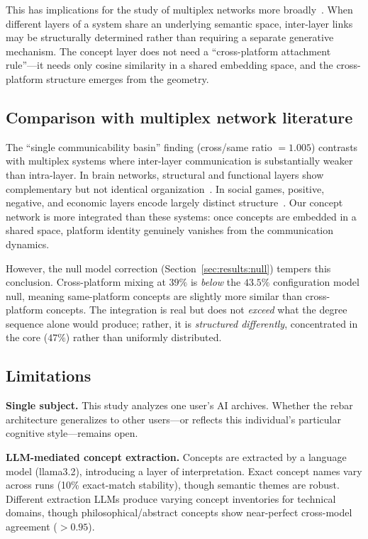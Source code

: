 \documentclass[11pt,twocolumn]{article}
\begin{document}
This has implications for the study of multiplex networks more broadly~\citep{boccaletti2014structure,kivela2014multilayer,battiston2014structural}.
When different layers of a system share an underlying semantic space, inter-layer links may be structurally determined rather than requiring a separate generative mechanism.
The concept layer does not need a ``cross-platform attachment rule''---it needs only cosine similarity in a shared embedding space, and the cross-platform structure emerges from the geometry.

\subsection{Comparison with multiplex network literature}

The ``single communicability basin'' finding (cross/same ratio $= 1.005$) contrasts with multiplex systems where inter-layer communication is substantially weaker than intra-layer.
In brain networks, structural and functional layers show complementary but not identical organization~\citep{bullmore2009complex}.
In social games, positive, negative, and economic layers encode largely distinct structure~\citep{szell2010multirelational}.
Our concept network is more integrated than these systems: once concepts are embedded in a shared space, platform identity genuinely vanishes from the communication dynamics.

However, the null model correction (Section~\ref{sec:results:null}) tempers this conclusion.
Cross-platform mixing at $39\%$ is \emph{below} the $43.5\%$ configuration model null, meaning same-platform concepts are slightly more similar than cross-platform concepts.
The integration is real but does not \emph{exceed} what the degree sequence alone would produce; rather, it is \emph{structured differently}, concentrated in the core ($47\%$) rather than uniformly distributed.

\subsection{Limitations}

\textbf{Single subject.}
This study analyzes one user's AI archives.
Whether the rebar architecture generalizes to other users---or reflects this individual's particular cognitive style---remains open.

\textbf{LLM-mediated concept extraction.}
Concepts are extracted by a language model (llama3.2), introducing a layer of interpretation.
Exact concept names vary across runs (10\% exact-match stability), though semantic themes are robust.
Different extraction LLMs produce varying concept inventories for technical domains, though philosophical/abstract concepts show near-perfect cross-model agreement ($> 0.95$).
\end{document}
